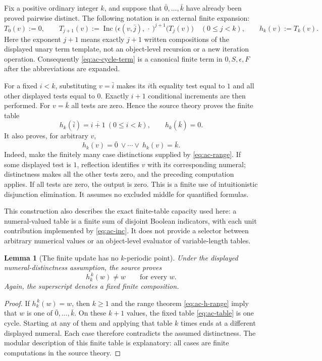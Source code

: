 \documentclass[11pt,letterpaper]{article}
\newtheorem{lemma}[theorem]{Lemma}
\theoremstyle{definition}\newtheorem{definition}[theorem]{Definition}
\theoremstyle{remark}\newtheorem{remark}[theorem]{Remark}
\begin{document}
Fix a positive ordinary integer $k$, and suppose that
$\bar0,\ldots,\bar k$ have already been proved pairwise distinct.
The following notation is an external finite expansion:
\[
 T_0(v):=0,\qquad
 T_{j+1}(v):=
 \operatorname{Inc}\bigl(\epsilon(v,\bar j),\,\cdot\,\bigr)^{j+1}
                      \bigl(T_j(v)\bigr)
 \quad(0\le j<k),\qquad
 h_k(v):=T_k(v).
 \tag{Finite cycle term}\label{eq:ac-cycle-term}
\]
Here the exponent $j+1$ means exactly $j+1$ written compositions of the
displayed unary term template, not an object-level recursion or a new
iteration operation. Consequently \eqref{eq:ac-cycle-term} is a canonical
finite term in $0,S,\epsilon,F$ after the abbreviations are expanded.

For a fixed $i<k$, substituting $v=\bar i$ makes its $i$th equality test
equal to $1$ and all other displayed tests equal to $0$. Exactly $i+1$
conditional increments are then performed. For $v=\bar k$ all tests are
zero. Hence the source theory proves the finite table
\begin{equation}
 h_k(\bar i)=\overline{i+1}\ (0\le i<k),\qquad
 h_k(\bar k)=0.
 \label{eq:ac-table}
\end{equation}
It also proves, for arbitrary $v$,
\begin{equation}
 h_k(v)=\bar0\ \lor\cdots\lor\ h_k(v)=\bar k.
 \label{eq:ac-h-range}
\end{equation}
Indeed, make the finitely many case distinctions supplied by
\eqref{eq:ac-range}. If some displayed test is $1$, reflection identifies
$v$ with its corresponding numeral; distinctness makes all the other
tests zero, and the preceding computation applies. If all tests are zero,
the output is zero. This is a finite use of intuitionistic disjunction
elimination. It assumes no excluded middle for quantified formulas.

This construction also describes the exact finite-table capacity used
here: a numeral-valued table is a finite sum of disjoint Boolean
indicators, with each unit contribution implemented by
\eqref{eq:ac-inc}. It does not provide a selector between arbitrary
numerical values or an object-level evaluator of variable-length tables.

\begin{lemma}[The finite update has no $k$-periodic point]
\label{lem:ac-finite-update}
Under the displayed numeral-distinctness assumption, the source proves
\[
                       h_k^{\,k}(w)\ne w
                       \qquad\text{for every }w.
\]
Again, the superscript denotes a fixed finite composition.
\end{lemma}
\begin{proof}
If $h_k^{\,k}(w)=w$, then $k\ge1$ and the range theorem
\eqref{eq:ac-h-range} imply that $w$ is one of
$\bar0,\ldots,\bar k$. On these $k+1$ values, the fixed table
\eqref{eq:ac-table} is one cycle. Starting at any of them and applying
that table $k$ times ends at a different displayed numeral. Each case
therefore contradicts the assumed distinctness. The modular description
of this finite table is explanatory: all cases are finite computations
in the source theory.
\end{proof}
\end{document}
